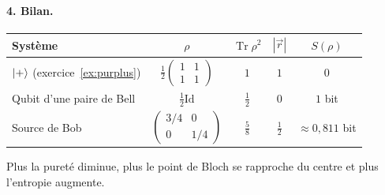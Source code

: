 \begin{correction}
\paragraph{4. Bilan.}
\begin{center}
\renewcommand{\arraystretch}{1.6}
\begin{tabular}{@{}lcccc@{}}
\toprule
\textbf{Système} & $\rho$ & $\operatorname{Tr}\rho^2$ & $|\vec r|$ & $S(\rho)$ \\
\midrule
$|+\rangle$ (exercice~\ref{ex:purplus})
  & $\frac12\left(\begin{smallmatrix}1&1\\1&1\end{smallmatrix}\right)$ & $1$ & $1$ & $0$ \\
Qubit d'une paire de Bell & $\frac12\mathrm{Id}$ & $\frac12$ & $0$ & $1$ bit \\
Source de Bob
  & $\left(\begin{smallmatrix}3/4&0\\0&1/4\end{smallmatrix}\right)$ & $\frac58$ & $\frac12$ & $\approx0{,}811$ bit \\
\bottomrule
\end{tabular}
\end{center}
Plus la pureté diminue, plus le point de Bloch se rapproche du centre et plus l'entropie augmente.
\end{correction}

